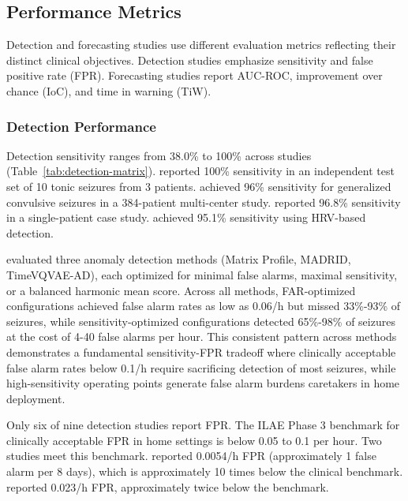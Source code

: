 \subsection{Performance Metrics}

Detection and forecasting studies use different evaluation metrics reflecting their distinct clinical objectives. Detection studies emphasize sensitivity and false positive rate (FPR). Forecasting studies report AUC-ROC, improvement over chance (IoC), and time in warning (TiW).

\subsubsection{Detection Performance}

Detection sensitivity ranges from 38.0\% to 100\% across studies (Table~\ref{tab:detection-matrix}). \textcite{fineDetectionKeyAutomated2025} reported 100\% sensitivity in an independent test set of 10 tonic seizures from 3 patients. \textcite{spahrDeepLearningbasedDetection2025} achieved 96\% sensitivity for generalized convulsive seizures in a 384-patient multi-center study. \textcite{singhrathoreDevelopmentMultimodalMachine2024} reported 96.8\% sensitivity in a single-patient case study. \textcite{elemamAutomatedValidatedTool2025} achieved 95.1\% sensitivity using HRV-based detection.

\textcite{reintjesECGBasedDetectionEpileptic2025} evaluated three anomaly detection methods (Matrix Profile, MADRID, TimeVQVAE-AD), each optimized for minimal false alarms, maximal sensitivity, or a balanced harmonic mean score. Across all methods, FAR-optimized configurations achieved false alarm rates as low as 0.06/h but missed 33\%-93\% of seizures, while sensitivity-optimized configurations detected 65\%-98\% of seizures at the cost of 4-40 false alarms per hour. This consistent pattern across methods demonstrates a fundamental sensitivity-FPR tradeoff where clinically acceptable false alarm rates below 0.1/h require sacrificing detection of most seizures, while high-sensitivity operating points generate false alarm burdens caretakers in home deployment.

Only six of nine detection studies report FPR. The ILAE Phase 3 benchmark for clinically acceptable FPR in home settings is below 0.05 to 0.1 per hour. Two studies meet this benchmark. \textcite{spahrDeepLearningbasedDetection2025} reported 0.0054/h FPR (approximately 1 false alarm per 8 days), which is approximately 10 times below the clinical benchmark. \textcite{fineDetectionKeyAutomated2025} reported 0.023/h FPR, approximately twice below the benchmark.


